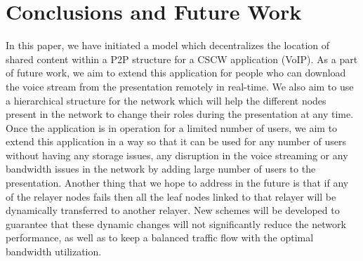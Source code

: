\section{Conclusions and Future Work} 
In this paper, we have initiated a model which decentralizes the location of 
shared content within a P2P structure for a CSCW application (VoIP). 
As a part of future work, we aim to extend this application for people who can 
download the voice stream from the presentation remotely in real-time. We also 
aim to use a hierarchical structure for the network which will help the 
different nodes present in the network to change their roles during the 
presentation at any time. Once the application is in operation for a limited 
number of users, we aim to extend this application in a way so that it 
can be used for any number of users without having any storage issues, any 
disruption in the voice streaming or any bandwidth issues in the network by 
adding large number of users to the presentation. Another thing that we hope to 
address in the future is that if any of the relayer nodes fails then all 
the leaf nodes linked to that relayer will be dynamically transferred to 
another relayer. New schemes will be developed to guarantee that these dynamic 
changes will not significantly reduce the network performance, as well as to 
keep a balanced traffic flow with the optimal bandwidth utilization.